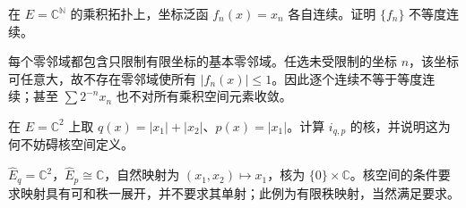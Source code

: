 \begin{exercise}[等度连续不可省略]\label{ex:y10-equicontinuity}
在 $E=\mathbb C^{\mathbb N}$ 的乘积拓扑上，坐标泛函 $f_n(x)=x_n$ 各自连续。证明 $\{f_n\}$ 不等度连续。
\end{exercise}
\begin{solution}
每个零邻域都包含只限制有限坐标的基本零邻域。任选未受限制的坐标 $n$，该坐标可任意大，故不存在零邻域使所有 $|f_n(x)|\le1$。因此逐个连续不等于等度连续；甚至 $\sum2^{-n}x_n$ 也不对所有乘积空间元素收敛。
\end{solution}

\begin{exercise}[自然映射不必单射]\label{ex:y10-canonical-kernel}
在 $E=\mathbb C^2$ 上取 $q(x)=|x_1|+|x_2|$、$p(x)=|x_1|$。计算 $i_{q,p}$ 的核，并说明这为何不妨碍核空间定义。
\end{exercise}
\begin{solution}
$\widehat E_q=\mathbb C^2$，$\widehat E_p\cong\mathbb C$，自然映射为 $(x_1,x_2)\mapsto x_1$，核为 $\{0\}\times\mathbb C$。核空间的条件要求映射具有可和秩一展开，并不要求其单射；此例为有限秩映射，当然满足要求。
\end{solution}
